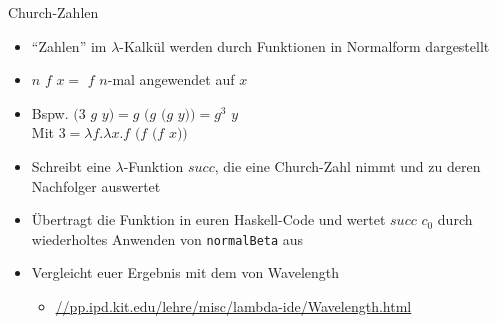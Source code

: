 \documentclass{beamer}
\begin{document}
\begin{frame}{Church-Zahlen}
	\begin{itemize}
		\item \enquote{Zahlen} im $\lambda$-Kalkül werden durch Funktionen in Normalform dargestellt
		\item $n$ $f$ $x =$ $f$ $n$-mal angewendet auf $x$
		\item Bspw. $(3$ $g$ $y) = g$ $(g $ $(g$ $y)) = g^3$ $y$\\
		      Mit $3 = \lambda{}f.\lambda{}x.f$ $(f $ $(f$ $x))$
		\item Schreibt eine $\lambda$-Funktion $succ$, die eine Church-Zahl nimmt und zu deren Nachfolger auswertet
		\pause
		\item Übertragt die Funktion in euren Haskell-Code und wertet $succ$ $c_0$ durch wiederholtes Anwenden von \texttt{normalBeta} aus
		\item Vergleicht euer Ergebnis mit dem von Wavelength
		\begin{itemize}
			\item \url{//pp.ipd.kit.edu/lehre/misc/lambda-ide/Wavelength.html}
		\end{itemize}
	\end{itemize}
\end{frame}
\end{document}
